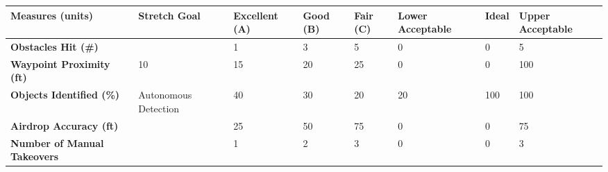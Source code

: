 \begin{table}[H]
	\centering
\begin{tabular}{|P{3cm}|P{1.8cm}|P{1.7cm}|P{1.2cm}|P{1cm}|P{1.7cm}|P{1.2cm}|P{1.7cm}|}
	\hline
{}	
	{\color[HTML]{000000} \textbf{Measures (units)}} & {\color[HTML]{000000}\textbf{Stretch Goal}} & {\color[HTML]{000000}\textbf{Excellent (A)}} & {\color[HTML]{000000}\textbf{Good (B)}} & {\color[HTML]{000000}\textbf{Fair (C)}} & {\color[HTML]{000000}\textbf{Lower Acceptable}} & {\color[HTML]{000000}\textbf{Ideal}} & {\color[HTML]{000000}\textbf{Upper Acceptable}} \\
	\hline
	\textbf{Obstacles Hit (\#)} & & 1 & 3 & 5 & 0 & 0 & 5 \\
	\hline
	\textbf{Waypoint Proximity (ft)} & 10 & 15 & 20 & 25 & 0 & 0 & 100 \\
	\hline
	\textbf{Objects Identified (\%)} & Autonomous Detection & 40 & 30 & 20 & 20 & 100 & 100 \\
	\hline
	\textbf{Airdrop Accuracy (ft)} & & 25 & 50 & 75 & 0 & 0 & 75 \\
	\hline
	\textbf{Number of Manual Takeovers} & & 1 & 2 & 3 & 0 & 0 & 3 \\
	\hline
\end{tabular}
\end{table}
